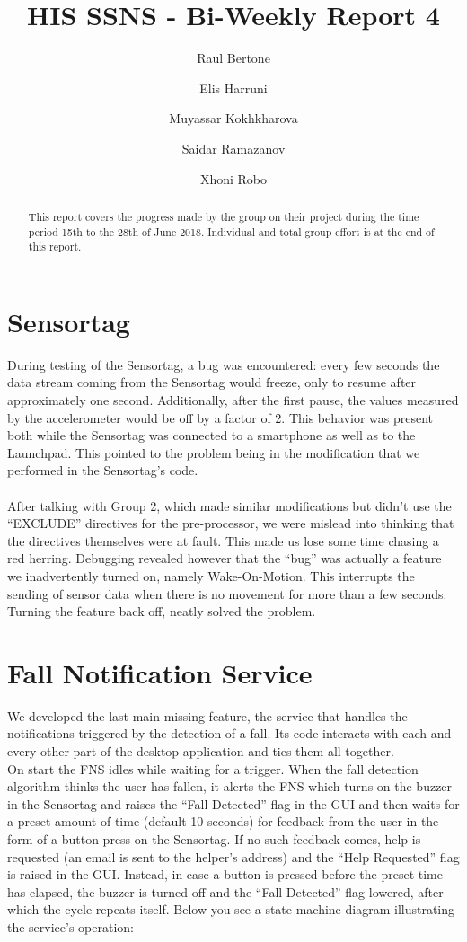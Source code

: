 \documentclass[12pt]{article}
\title{HIS SSNS - Bi-Weekly Report 4}
\author{
	 Raul Bertone
\and Elis Harruni
\and Muyassar Kokhkharova
\and Saidar Ramazanov
\and Xhoni Robo
}
\begin{document}
\maketitle

\begin{abstract}
 This report covers the progress made by the group on their project during the time period 15th to the 28th of June 2018. Individual and total group effort is at the end of this report.
\end{abstract}

\section{Sensortag}
During testing of the Sensortag, a bug was encountered: every few seconds the data stream coming from the Sensortag would freeze, only to resume after approximately one second. Additionally, after the first pause, the values measured by the accelerometer would be off by a factor of 2. This behavior was present both while the Sensortag was connected to a smartphone as well as to the Launchpad. This pointed to the problem being in the modification that we performed in the Sensortag’s code.\\\\
After talking with Group 2, which made similar modifications but didn’t use the “EXCLUDE” directives for the pre-processor, we were mislead into thinking that the directives themselves were at fault. This made us lose some time chasing a red herring. Debugging revealed however that the “bug” was actually a feature we inadvertently turned on, namely  Wake-On-Motion. This interrupts the sending of sensor data when there is no movement for more than a few seconds. Turning the feature back off, neatly solved the problem.

\section{Fall Notification Service}
We developed the last main missing feature, the service that handles the notifications triggered by the detection of a fall. Its code interacts with each and every other part of the desktop application and ties them all together.\\
On start the FNS idles while waiting for a trigger. When the fall detection algorithm thinks the user has fallen, it alerts the FNS which turns on the buzzer in the Sensortag and raises the “Fall Detected” flag in the GUI and then waits for a preset amount of time (default 10 seconds) for feedback from the user in the form of a button press on the Sensortag. If no such feedback comes, help is requested (an email is sent to the helper’s address) and the “Help Requested” flag is raised in the GUI. Instead, in case a button is pressed before the preset time has elapsed, the buzzer is turned off and the “Fall Detected” flag lowered, after which the cycle repeats itself.
Below you see a state machine diagram illustrating the service’s operation:
\end{document}
